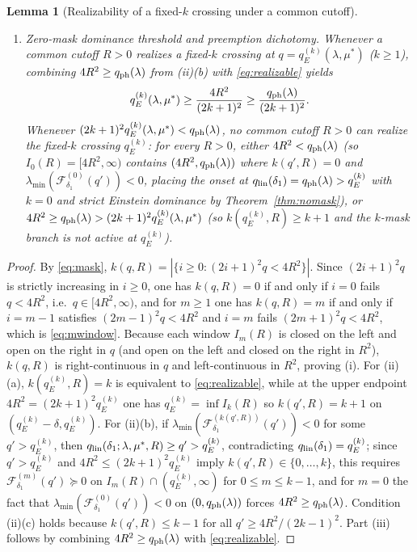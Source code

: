 \documentclass[11pt]{article}
\newcommand{\Fcal}{\mathcal F}
\newcommand{\muS}{\mu^{*}}
\newtheorem{lemma}[theorem]{Lemma}
\theoremstyle{definition}
\theoremstyle{remark}
\begin{document}
\begin{lemma}[Realizability of a fixed-$k$ crossing under a common cutoff]
\begin{enumerate}[label=(\roman*),leftmargin=2.2em]
\begin{enumerate}[label=(\alph*),leftmargin=1.8em]
$q_p^{(k)}(\lambda,\muS)<4R^2/(2k-1)^2$ (otherwise the comparison switches to $k'<k$).
\end{enumerate}
\item \emph{Zero-mask dominance threshold and preemption dichotomy.} Whenever a common
cutoff $R>0$ realizes a fixed-$k$ crossing at $q=q_E^{(k)}(\lambda,\muS)$ ($k\ge1$),
combining $4R^2\ge q_{\rm ph}(\lambda)$ from (ii)(b) with \eqref{eq:realizable} yields
\begin{equation}\label{eq:qekbound}
q_E^{(k)}(\lambda,\muS)\ge\frac{4R^2}{(2k+1)^2}\ge\frac{q_{\rm ph}(\lambda)}{(2k+1)^2}.
\end{equation}
Whenever $(2k+1)^2q_E^{(k)}(\lambda,\muS)<q_{\rm ph}(\lambda)$, no common cutoff $R>0$ can
realize the fixed-$k$ crossing $q_E^{(k)}$: for every $R>0$, either $4R^2<q_{\rm ph}(\lambda)$
(so $I_0(R)=[4R^2,\infty)$ contains $(4R^2,q_{\rm ph}(\lambda))$ where $k(q',R)=0$ and
$\lambda_{\min}(\Fcal_{\delta_1}^{(0)}(q'))<0$, placing the onset at
$q_{\rm lin}(\delta_1)=q_{\rm ph}(\lambda)>q_E^{(k)}$ with $k=0$ and strict Einstein
dominance by Theorem~\ref{thm:nomask}), or
$4R^2\ge q_{\rm ph}(\lambda)>(2k+1)^2q_E^{(k)}(\lambda,\muS)$ (so
$k(q_E^{(k)},R)\ge k+1$ and the $k$-mask branch is not active at $q_E^{(k)}$).
\end{enumerate}
\end{lemma}

\begin{proof}
By \eqref{eq:mask}, $k(q,R)=|\{i\ge0:(2i+1)^2q<4R^2\}|$. Since $(2i+1)^2q$ is strictly
increasing in $i\ge0$, one has $k(q,R)=0$ if and only if $i=0$ fails $q<4R^2$, i.e.\
$q\in[4R^2,\infty)$, and for $m\ge1$ one has $k(q,R)=m$ if and only if $i=m-1$ satisfies
$(2m-1)^2q<4R^2$ and $i=m$ fails $(2m+1)^2q<4R^2$, which is \eqref{eq:mwindow}. Because
each window $I_m(R)$ is closed on the left and open on the right in $q$ (and open on the
left and closed on the right in $R^2$), $k(q,R)$ is right-continuous in $q$ and
left-continuous in $R^2$, proving (i). For (ii)(a), $k(q_E^{(k)},R)=k$ is equivalent to
\eqref{eq:realizable}, while at the upper endpoint $4R^2=(2k+1)^2q_E^{(k)}$ one has
$q_E^{(k)}=\inf I_k(R)$ so $k(q',R)=k+1$ on $(q_E^{(k)}-\delta,q_E^{(k)})$. For (ii)(b), if
$\lambda_{\min}(\Fcal_{\delta_1}^{(k(q',R))}(q'))<0$ for some $q'>q_E^{(k)}$, then
$q_{\rm lin}(\delta_1;\lambda,\muS,R)\ge q'>q_E^{(k)}$, contradicting
$q_{\rm lin}(\delta_1)=q_E^{(k)}$; since $q'>q_E^{(k)}$ and $4R^2\le(2k+1)^2q_E^{(k)}$ imply
$k(q',R)\in\{0,\dots,k\}$, this requires $\Fcal_{\delta_1}^{(m)}(q')\succeq0$ on
$I_m(R)\cap(q_E^{(k)},\infty)$ for $0\le m\le k-1$, and for $m=0$ the fact that
$\lambda_{\min}(\Fcal_{\delta_1}^{(0)}(q'))<0$ on $(0,q_{\rm ph}(\lambda))$ forces
$4R^2\ge q_{\rm ph}(\lambda)$. Condition (ii)(c) holds because $k(q',R)\le k-1$ for all
$q'\ge4R^2/(2k-1)^2$. Part (iii) follows by combining $4R^2\ge q_{\rm ph}(\lambda)$ with
\eqref{eq:realizable}.
\end{proof}
\end{document}
